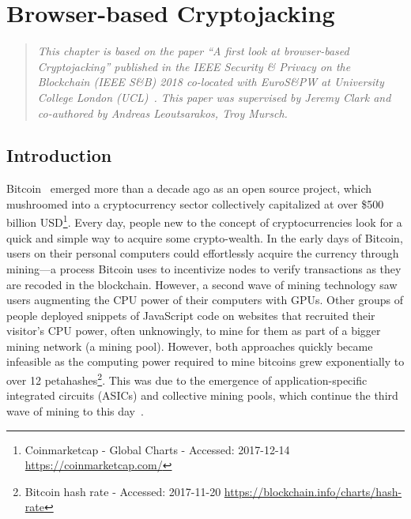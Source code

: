 

\chapter{Browser-based Cryptojacking}\label{sec:cryptojacking}

\begin{quote}
	\textit{This chapter is based on the paper ``A first look at browser-based Cryptojacking'' published in the IEEE Security \& Privacy on the Blockchain (IEEE S\&B) 2018 co-located with EuroS\&PW at University College London (UCL)~\cite{eskandari2018first}. This paper was supervised by Jeremy Clark and co-authored by Andreas Leoutsarakos, Troy Mursch.}
\end{quote}

\section{Introduction}



Bitcoin~\cite{nakamoto2008bitcoin} emerged more than a decade ago as an open source project, which mushroomed into a cryptocurrency sector collectively capitalized at over \$500 billion USD\footnote{Coinmarketcap - Global Charts - Accessed: 2017-12-14 \url{https://coinmarketcap.com/}}. Every day, people new to the concept of cryptocurrencies look for a quick and simple way to acquire some crypto-wealth. In the early days of Bitcoin, users on their personal computers could effortlessly acquire the currency through mining---a process Bitcoin uses to incentivize nodes to verify transactions as they are recoded in the blockchain. However, a second wave of mining technology saw users augmenting the CPU power of their computers with GPUs. Other groups of people deployed snippets of JavaScript code on websites that recruited their visitor's CPU power, often unknowingly, to mine for them as part of a bigger mining network (\ie a mining pool). However, both approaches quickly became infeasible as the computing power required to mine bitcoins grew exponentially to over 12 petahashes\footnote{Bitcoin hash rate - Accessed: 2017-11-20 \url{https://blockchain.info/charts/hash-rate}}. This was due to the emergence of application-specific integrated circuits (ASICs) and collective mining pools, which continue the third wave of mining to this day~\cite{narayanan2016}. 

